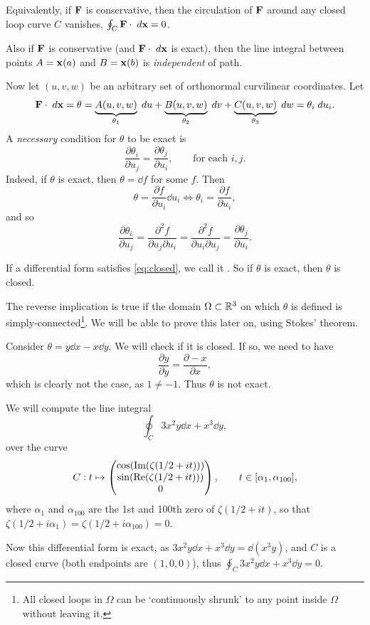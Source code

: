 \documentclass[a4paper]{scrartcl}
\begin{document}
Equivalently, if $\mathbf{F}$ is conservative, then the circulation of $\mathbf{F}$ around any closed loop curve $C$ vanishes,  $\oint_C \mathbf{F} \cdot \; d \mathbf{x} = 0$.

Also if $\mathbf{F}$ is conservative (and $\mathbf{F} \cdot \; d \mathbf{x}$ is exact), then the line integral between points $A = \mathbf{x}(a)$ and $B = \mathbf{x}(b)$ is \emph{independent} of path.

Now let $(u, v, w)$ be an arbitrary set of orthonormal curvilinear coordinates. Let
$$
\mathbf{F} \cdot \; d \mathbf{x} = \theta = \underbrace{A(u, v, w)}_{\theta_1} \; d u + \underbrace{B(u, v, w)}_{\theta_2} \; d v + \underbrace{C(u, v, w)}_{\theta_3} \; d w = \theta_i \; d u_i.
$$
A \emph{necessary} condition for $\theta$ to be exact is
$$
	\frac{\partial \theta_i}{\partial u_j} = \frac{\partial \theta_j}{\partial u_i}, \quad \quad \text{for each }i, j.
$$
Indeed, if $\theta$ is exact, then $\theta = \dd f$ for some $f$. Then
\begin{equation}\label{eq:closed}
	\theta = \frac{\partial f}{\partial u_i} \dd u_i \iff \theta_i = \frac{\partial f}{\partial u_i},\tag{$*$}
\end{equation}
and so
$$
	\frac{\partial \theta_i}{\partial u_j} = \frac{\partial^2 f}{\partial u_j \partial u_i} = \frac{\partial^2 f}{\partial u_i \partial u_j} = \frac{\partial \theta_j}{ \partial u_i}.
$$

If a differential form satisfies \eqref{eq:closed}, we call it . So if $\theta$ is exact, then $\theta$ is closed.

The reverse implication is true if the domain $\Omega \subset \mathbb{R}^3$ on which $\theta$ is defined is simply-connected\footnote{All closed loops in $\Omega$ can be `continuously shrunk' to any point inside $\Omega$ without leaving it.}. We will be able to prove this later on, using Stokes' theorem.

\begin{example}
	Consider $\theta = y \dd x - x \dd y$. We will check if it is closed. If so, we need to have
	$$
	\frac{\partial y}{\partial y} = \frac{\partial -x}{\partial x},
	$$
	which is clearly not the case, as $1 \neq -1$. Thus $\theta$ is not exact.
\end{example}

\begin{example}
	We will compute the line integral
	$$
	\oint_C 3x^2 y \dd x + x^3 \dd y,
	$$
	over the curve
	$$
	C: t \mapsto \begin{pmatrix}
		\cos(\operatorname{Im}(\zeta(1/2 + it))) \\
		\sin(\operatorname{Re}(\zeta(1/2 + it))) \\
		0
	\end{pmatrix}, \quad \quad t \in [\alpha_1, \alpha_{100}],
	$$
	where $\alpha_1$ and $\alpha_{100}$ are the 1st and 100th zero of $\zeta(1/2 + it)$, so that $\zeta(1/2 + i \alpha_1) = \zeta(1/2 + i \alpha_{100}) = 0$.
	
	Now this differential form is exact, as $3x^2 y \dd x + x^3 \dd y = \dd (x^3 y)$, and $C$ is a closed curve (both endpoints are $(1, 0, 0)$), thus $\oint_C 3x^2 y \dd x + x^3 \dd y = 0$.
\end{example}
\end{document}

